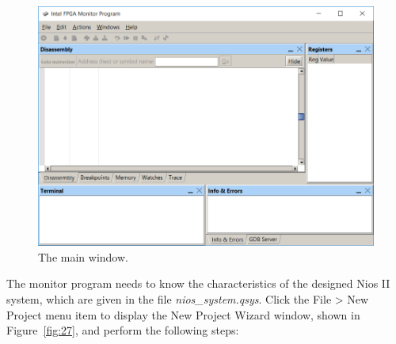 \documentclass[11pt, twoside, pdftex]{article}
\begin{document}
\begin{figure}[H]
   \begin{center}
      \includegraphics[scale=0.7]{figures/figure26.png}
   \end{center}
   \caption{The \productNameMed{} main window.} 
	\label{fig:26}
\end{figure}

\newpage
\noindent 
The monitor program needs to know the characteristics
of the designed Nios II system, which are given in the file {\it nios\_system.qsys}.  
Click the {\sf File > New Project} menu item to display the New Project Wizard window, shown in
Figure~\ref{fig:27}, and perform the following steps:
\end{document}
